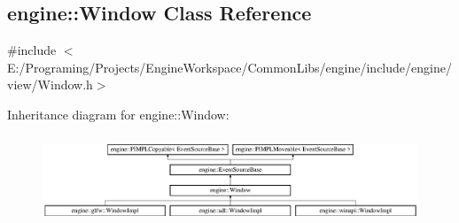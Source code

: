 \hypertarget{a00082}{}\subsection{engine\+:\+:Window Class Reference}
\label{a00082}


{\ttfamily \#include $<$E\+:/\+Programing/\+Projects/\+Engine\+Workspace/\+Common\+Libs/engine/include/engine/view/\+Window.\+h$>$}

Inheritance diagram for engine\+:\+:Window\+:\begin{figure}[H]
\begin{center}
\leavevmode
\includegraphics[height=2.647754cm]{a00082}
\end{center}
\end{figure}
